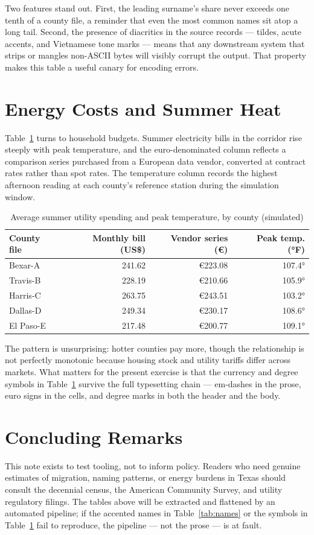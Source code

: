 \documentclass[11pt]{article}
\begin{document}
Two features stand out. First, the leading surname's share never exceeds one tenth of a county file, a reminder that even the most common names sit atop a long tail. Second, the presence of diacritics in the source records --- tildes, acute accents, and Vietnamese tone marks --- means that any downstream system that strips or mangles non-ASCII bytes will visibly corrupt the output. That property makes this table a useful canary for encoding errors.

\section{Energy Costs and Summer Heat}

Table~\ref{tab:energy} turns to household budgets. Summer electricity bills in the corridor rise steeply with peak temperature, and the euro-denominated column reflects a comparison series purchased from a European data vendor, converted at contract rates rather than spot rates. The temperature column records the highest afternoon reading at each county's reference station during the simulation window.

\begin{table}[ht]
\centering
\caption{Average summer utility spending and peak temperature, by county (simulated)}
\label{tab:energy}
\begin{tabular}{lrrr}
\toprule
County file & Monthly bill (US\$) & Vendor series (€) & Peak temp. (°F) \\
\midrule
Bexar-A & 241.62 & €223.08 & 107.4° \\
Travis-B & 228.19 & €210.66 & 105.9° \\
Harris-C & 263.75 & €243.51 & 103.2° \\
Dallas-D & 249.34 & €230.17 & 108.6° \\
El Paso-E & 217.48 & €200.77 & 109.1° \\
\bottomrule
\end{tabular}
\end{table}

The pattern is unsurprising: hotter counties pay more, though the relationship is not perfectly monotonic because housing stock and utility tariffs differ across markets. What matters for the present exercise is that the currency and degree symbols in Table~\ref{tab:energy} survive the full typesetting chain --- em-dashes in the prose, euro signs in the cells, and degree marks in both the header and the body.

\section{Concluding Remarks}

This note exists to test tooling, not to inform policy. Readers who need genuine estimates of migration, naming patterns, or energy burdens in Texas should consult the decennial census, the American Community Survey, and utility regulatory filings. The tables above will be extracted and flattened by an automated pipeline; if the accented names in Table~\ref{tab:names} or the symbols in Table~\ref{tab:energy} fail to reproduce, the pipeline --- not the prose --- is at fault.
\end{document}
